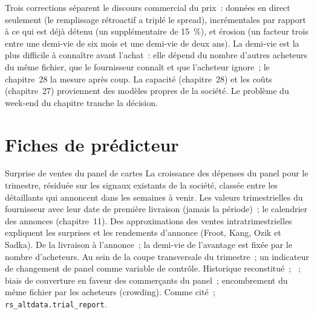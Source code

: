 Trois corrections séparent le discours commercial du prix~: données en direct seulement (le remplissage rétroactif a triplé le spread), incrémentales par rapport à ce qui est déjà détenu (un
supplémentaire de 15~\%), et érosion (un facteur trois entre une demi-vie de six mois et une demi-vie de deux ans). La demi-vie est la plus difficile à connaître avant
l'achat~: elle dépend du nombre d'autres acheteurs du même fichier, que le fournisseur connaît et que l'acheteur ignore~; le chapitre~28 la mesure après coup.
La capacité (chapitre~28) et les coûts (chapitre~27) proviennent des modèles propres de la société. Le problème du week-end du chapitre tranche la décision.

\section{Fiches de prédicteur}

\begin{predictorcard}{Surprise de ventes du panel de cartes}\label{pred:rs:alternative-and-text-data:card}
 La croissance des dépenses du panel pour le trimestre, résiduée sur les signaux existants de la société, classée entre les détaillants
qui annoncent dans les semaines à venir.
 Les valeurs trimestrielles du fournisseur avec leur date de première livraison (jamais la période)~; le calendrier des annonces
(chapitre~11).
 Des approximations des ventes intratrimestrielles expliquent les surprises et les rendements d'annonce (Froot, Kang, Ozik et Sadka).
 De la livraison à l'annonce~; la demi-vie de l'avantage est fixée par le nombre d'acheteurs.
 Au sein de la coupe transversale du trimestre~; un indicateur de changement de panel comme variable de contrôle.
 Historique reconstitué~; ~; biais de couverture en faveur des commerçants du panel~; encombrement du même fichier par les acheteurs (crowding).
 Comme cité~; \texttt{rs\_altdata.trial\_report}.
\end{predictorcard}

